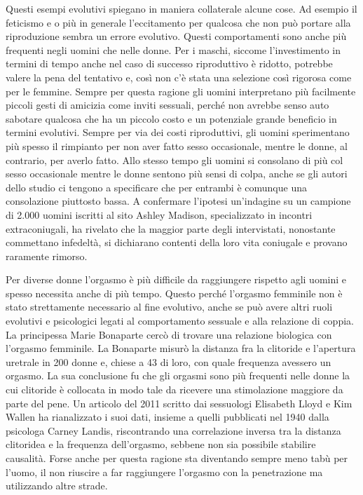 \documentclass[12pt]{book} %
\begin{document}
Questi esempi evolutivi spiegano in maniera collaterale alcune cose. Ad esempio il feticismo e o più in generale
l'eccitamento per qualcosa che non può portare alla riproduzione sembra un errore evolutivo.
Questi comportamenti sono anche più frequenti negli uomini che nelle donne. Per i maschi, siccome
l'investimento in termini di tempo anche nel caso di successo riproduttivo è ridotto, potrebbe valere la pena
del tentativo e, così non c'è stata una selezione così rigorosa come per le femmine. Sempre per
questa ragione gli uomini interpretano più facilmente piccoli gesti di amicizia come inviti sessuali, perché non
avrebbe senso auto sabotare qualcosa che ha un piccolo costo e un potenziale grande beneficio in termini evolutivi.
Sempre per via dei costi riproduttivi, gli uomini sperimentano più spesso il rimpianto per non aver fatto sesso
occasionale, mentre le donne, al contrario, per averlo
fatto.
Allo stesso tempo gli uomini si consolano di più col sesso occasionale mentre le donne sentono più sensi di colpa, anche se gli autori dello studio ci tengono a specificare che per entrambi è comunque una consolazione piuttosto bassa. A confermare l'ipotesi un'indagine su un campione di 2.000 uomini iscritti al sito Ashley Madison, specializzato in incontri extraconiugali, ha rivelato che la maggior parte degli intervistati, nonostante commettano infedeltà, si dichiarano contenti della loro vita coniugale e provano raramente rimorso. 

Per diverse donne l'orgasmo è più difficile da raggiungere
rispetto agli uomini e spesso necessita anche di più tempo. Questo perché l'orgasmo femminile non
è stato strettamente necessario al fine evolutivo, anche se può avere altri ruoli evolutivi e psicologici legati al comportamento sessuale e alla relazione di coppia. La principessa Marie Bonaparte cercò di trovare una relazione biologica con
l'orgasmo femminile. La Bonaparte misurò la distanza fra la clitoride e
l'apertura uretrale in 200 donne e, chiese a 43 di loro, con quale frequenza avessero un orgasmo.
La sua conclusione fu che gli orgasmi sono più frequenti nelle donne la cui clitoride è collocata in modo tale da
ricevere una stimolazione maggiore da parte del pene. Un articolo del 2011 scritto dai sessuologi Elisabeth Lloyd e Kim
Wallen ha rianalizzato i suoi dati, insieme a quelli pubblicati nel 1940 dalla psicologa Carney Landis, riscontrando una correlazione inversa tra la distanza clitoridea e la frequenza dell’orgasmo, sebbene non sia possibile stabilire causalità. Forse anche per questa ragione sta diventando sempre meno tabù per l'uomo, il non riuscire a far raggiungere l'orgasmo con la penetrazione ma utilizzando altre strade.
\end{document}
